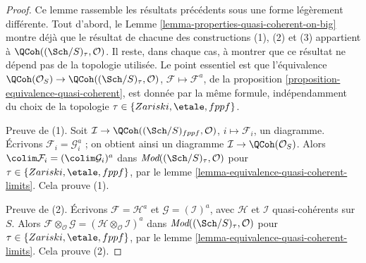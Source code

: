 \begin{proof}
Ce lemme rassemble les résultats précédents sous une forme légèrement
différente. Tout d'abord, le
Lemme \ref{lemma-properties-quasi-coherent-on-big} montre déjà que le
résultat de chacune des constructions (1), (2) et (3) appartient à
$\QCoh((\Sch/S)_\tau, \mathcal{O})$. Il reste, dans chaque cas, à montrer
que ce résultat ne dépend pas de la topologie utilisée. Le point essentiel
est que l'équivalence
$\QCoh(\mathcal{O}_S) \to \QCoh((\Sch/S)_\tau, \mathcal{O})$,
$\mathcal{F} \mapsto \mathcal{F}^a$, de la
proposition \ref{proposition-equivalence-quasi-coherent}, est donnée par la
même formule, indépendamment du choix de la topologie
$\tau \in \{Zariski, \etale, fppf\}$.

\medskip\noindent
Preuve de (1). Soit
$\mathcal{I} \to \QCoh((\Sch/S)_{fppf}, \mathcal{O})$,
$i \mapsto \mathcal{F}_i$, un diagramme. Écrivons
$\mathcal{F}_i = \mathcal{G}_i^a$ ; on obtient ainsi un diagramme
$\mathcal{I} \to \QCoh(\mathcal{O}_S)$. Alors
$\colim \mathcal{F}_i = (\colim \mathcal{G}_i)^a$ dans
$\textit{Mod}((\Sch/S)_\tau, \mathcal{O})$ pour
$\tau \in \{Zariski, \etale, fppf\}$, par le
lemme \ref{lemma-equivalence-quasi-coherent-limits}. Cela prouve (1).

\medskip\noindent
Preuve de (2). Écrivons $\mathcal{F} = \mathcal{H}^a$ et
$\mathcal{G} = (\mathcal{I})^a$, avec $\mathcal{H}$ et $\mathcal{I}$
quasi-cohérents sur $S$. Alors
$\mathcal{F} \otimes_\mathcal{O} \mathcal{G} =
(\mathcal{H} \otimes_\mathcal{O} \mathcal{I})^a$ dans
$\textit{Mod}((\Sch/S)_\tau, \mathcal{O})$ pour
$\tau \in \{Zariski, \etale, fppf\}$, par le
lemme \ref{lemma-equivalence-quasi-coherent-limits}. Cela prouve (2).


\end{proof}

